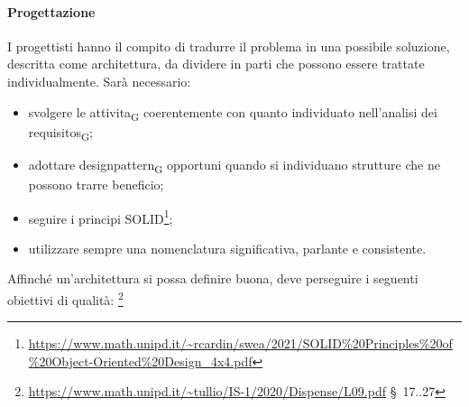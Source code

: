         \paragraph{Progettazione}
                I progettisti hanno il compito di tradurre il problema in una possibile soluzione, descritta come architettura, da dividere in parti che possono essere trattate individualmente. Sarà necessario:
                \begin{itemize}
                    \item svolgere le \gls{attivita}\textsubscript{G} coerentemente con quanto individuato nell'analisi dei \glspl{requisito}\textsubscript{G};
                    \item adottare \gls{designpattern}\textsubscript{G} opportuni quando si individuano strutture che ne possono trarre beneficio;
                    \item seguire i principi SOLID\footnote{\url{https://www.math.unipd.it/~rcardin/swea/2021/SOLID\%20Principles\%20of\%20Object-Oriented\%20Design_4x4.pdf}};
                    \item utilizzare sempre una nomenclatura significativa, parlante e consistente.
                \end{itemize}
                Affinché un'architettura si possa definire buona, deve perseguire i seguenti obiettivi di qualità: \footnote{\url{https://www.math.unipd.it/~tullio/IS-1/2020/Dispense/L09.pdf} \S\ 17..27}
